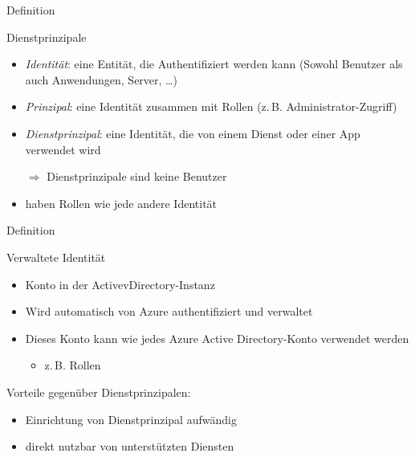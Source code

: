 \documentclass{scrartcl}
\newenvironment{flashcard}[2][]{%
    #1
    \vfill
    \centerline{\Large{#2}}
    \vfill
\newpage
}
{\newpage}
\begin{document}
    \begin{flashcard}[Definition]{Dienstprinzipale}
            \begin{itemize}
                \item \emph{Identität}: eine Entität, die Authentifiziert werden kann\newline
                    (Sowohl Benutzer als auch Anwendungen, Server, …)
                \item \emph{Prinzipal}: eine Identität zusammen mit Rollen\newline
                    (z.\,B. Administrator-Zugriff)
                \item \emph{Dienstprinzipal}: eine Identität, die von einem Dienst oder einer App verwendet wird
                \item[$\Rightarrow $] Dienstprinzipale sind keine Benutzer
                \item haben Rollen wie jede andere Identität
            \end{itemize}
    \end{flashcard}

    \begin{flashcard}[Definition]{Verwaltete Identität}
            \begin{itemize}
                \item Konto in der ActivevDirectory-Instanz
                \item Wird automatisch von Azure authentifiziert und verwaltet
                \item Dieses Konto kann wie jedes Azure Active Directory-Konto verwendet werden
                    \begin{itemize}
                        \item z.\,B. Rollen
                    \end{itemize}
            \end{itemize}
            Vorteile gegenüber Dienstprinzipalen:
            \begin{itemize}
                \item Einrichtung von Dienstprinzipal aufwändig
                \item direkt nutzbar von unterstützten Diensten
            \end{itemize}
    \end{flashcard}
\end{document}
